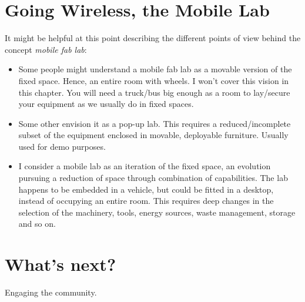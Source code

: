 \documentclass[a4paper,12pt,titlepage]{article}
\begin{document}
\section{Going Wireless, the Mobile Lab}
It might be helpful at this point describing the different points of view behind the concept \textit{mobile fab lab}:

\begin{itemize}
  \item Some people might understand a mobile fab lab as a movable version of the fixed space. Hence, an entire room with wheels. I won't cover this vision in this chapter. You will need a truck/bus big enough as a room to lay/secure your equipment as we usually do in fixed spaces.
  \item Some other envision it as a pop-up lab. This requires a reduced/incomplete subset of the equipment enclosed in movable, deployable furniture. Usually used for demo purposes.
  \item I consider a mobile lab as an iteration of the fixed space, an evolution pursuing a reduction of space through combination of capabilities. The lab happens to be embedded in a vehicle, but could be fitted in a desktop, instead of occupying an entire room. This requires deep changes in the selection of the machinery, tools, energy sources, waste management, storage and so on.
\end{itemize}




\section{What's next?}

Engaging the community.
\end{document}
